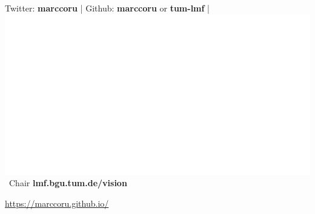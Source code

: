 \documentclass[%
  aspectratio=169,
  9pt,
  USenglish,
  titlegraphic, %
  affiliationintitlepagehead,
  progressbar,
]{beamer}
\begin{document}
{
	\begin{frame}[plain]
	\vfill
	\begin{center}
		\Huge\color{tumwhite}
	\end{center}
	
	
	\vspace{1em}	
	\color{white}
	{Twitter}: \textbf{marccoru} | {Github}: \textbf{marccoru} or \textbf{tum-lmf} | \includegraphics[height=.9em]{images/TUM-white}~{Chair} \textbf{lmf.bgu.tum.de/vision} \\ 
	
	\vspace{1em}
	
	\Large
	\url{https://marccoru.github.io/}
	
	\vfill
\end{frame}
}
\end{document}
